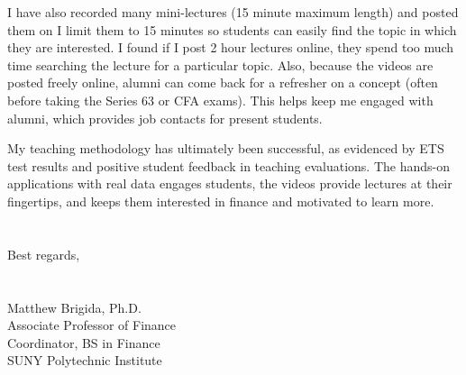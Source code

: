 \documentclass[12pt]{article}
\begin{document}
I have also recorded many mini-lectures (15 minute maximum length) and posted them on \href{https://www.youtube.com/channel/UCwekb0vAK-FKaqPF5gfd0eQ}{\color{Blue}{my YouTube channel.}} I limit them to 15 minutes so students can easily find the topic in which they are interested.  I found if I post 2 hour lectures online, they spend too much time searching the lecture for a particular topic.  Also, because the videos are posted freely online, alumni can come back for a refresher on a concept (often before taking the Series 63 or CFA exams).  This helps keep me engaged with alumni, which provides job contacts for present students.  

My teaching methodology has ultimately been successful, as evidenced by ETS test results and positive student feedback in teaching evaluations.  The hands-on applications with real data engages students, the videos provide lectures at their fingertips, and keeps them interested in finance and motivated to learn more. \\
\\
\\
Best regards,\\
\\
\\
Matthew Brigida, Ph.D.\\
Associate Professor of Finance\\
Coordinator, BS in Finance \\
SUNY Polytechnic Institute
\end{document}
